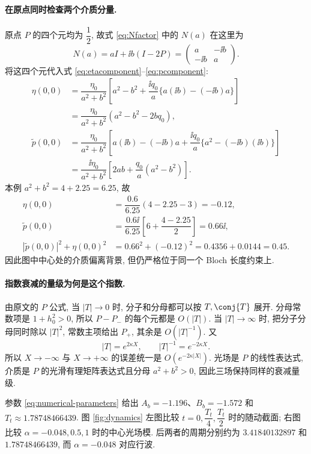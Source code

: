 \paragraph{在原点同时检查两个介质分量.}
原点 $P$ 的四个元均为 $\dfrac{1}{2}$, 故式 \eqref{eq:Nfactor} 中的 $N(a)$ 在这里为
\[
N(a)=aI+\ii b(I-2P)
=\begin{pmatrix}a&-\ii b\\-\ii b&a\end{pmatrix}.
\]
将这四个元代入式 \eqref{eq:etacomponent}--\eqref{eq:pcomponent}:
\begin{align*}
\eta(0,0)
&=\dfrac{\eta_0}{a^2+b^2}
\left[a^2-b^2+\dfrac{\ii q_0}{a}
\{a(\ii b)-(-\ii b)a\}\right]\\
&=\dfrac{\eta_0}{a^2+b^2}(a^2-b^2-2bq_0),\\
\widetilde p(0,0)
&=\dfrac{\eta_0}{a^2+b^2}
\left[a(\ii b)-(-\ii b)a
+\dfrac{\ii q_0}{a}\{a^2-(-\ii b)(\ii b)\}\right]\\
&=\dfrac{\ii\eta_0}{a^2+b^2}
\left[2ab+\dfrac{q_0}{a}(a^2-b^2)\right].
\end{align*}
本例 $a^2+b^2=4+2.25=6.25$, 故
\begin{align*}
\eta(0,0)&=\dfrac{0.6}{6.25}(4-2.25-3)=-0.12,\\
\widetilde p(0,0)&=\dfrac{0.6\ii}{6.25}
\left[6+\dfrac{4-2.25}{2}\right]=0.66\ii,\\
|\widetilde p(0,0)|^2+\eta(0,0)^2
&=0.66^2+(-0.12)^2=0.4356+0.0144=0.45.
\end{align*}
因此图中中心处的介质偏离背景, 但仍严格位于同一个 Bloch 长度约束上.

\paragraph{指数衰减的量级为何是这个指数.}
由原文的 $P$ 公式, 当 $|T|\to0$ 时, 分子和分母都可以按 $T,\conj{T}$ 展开. 分母常数项是 $1+h_0^2>0$, 所以 $P-P_-$ 的每个元都是 $O(|T|)$. 当 $|T|\to\infty$ 时, 把分子分母同时除以 $|T|^2$, 常数主项给出 $P_+$, 其余是 $O(|T|^{-1})$. 又
\[
|T|=e^{2\kappa X},\qquad
|T|^{-1}=e^{-2\kappa X}.
\]
所以 $X\to-\infty$ 与 $X\to+\infty$ 的误差统一是 $O(e^{-2\kappa|X|})$. 光场是 $P$ 的线性表达式, 介质是 $P$ 的光滑有理矩阵表达式且分母 $a^2+b^2>0$, 因此三场保持同样的衰减量级.

参数 \eqref{eq:numerical-parameters} 给出 $A_b=-1.196$、$B_b=-1.572$ 和 $T_t\approx1.78748466439$. 图 \ref{fig:dynamics} 左图比较 $t=0,\dfrac{T_t}{4},\dfrac{T_t}{2}$ 时的随动截面; 右图比较 $\alpha=-0.048,0.5,1$ 时的中心光场模. 后两者的周期分别约为 $3.41840132897$ 和 $1.78748466439$, 而 $\alpha=-0.048$ 对应行波.
